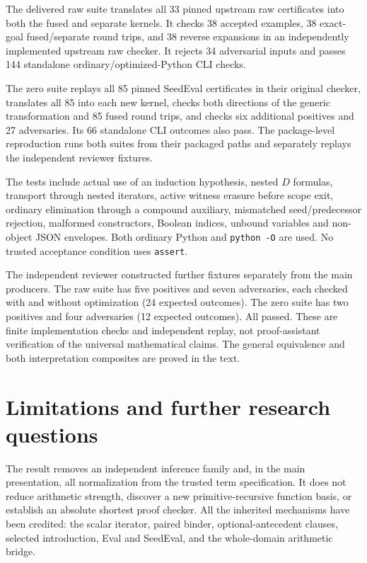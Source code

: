 The delivered raw suite translates all 33 pinned upstream raw certificates
into both the fused and separate kernels. It checks 38 accepted examples,
38 exact-goal fused/separate round trips, and 38 reverse expansions in an
independently implemented upstream raw checker. It rejects 34 adversarial
inputs and passes 144 standalone ordinary/optimized-Python CLI checks.

The zero suite replays all 85 pinned SeedEval certificates in their original
checker, translates all 85 into each new kernel, checks both directions
of the generic transformation and 85 fused round trips, and checks six
additional positives and 27 adversaries. Its 66 standalone CLI outcomes
also pass. The package-level reproduction runs both suites from their
packaged paths and separately replays the independent reviewer fixtures.


The tests include actual use of an induction hypothesis, nested $D$
formulas, transport through nested iterators, active witness erasure before
scope exit, ordinary elimination through a compound auxiliary, mismatched
seed/predecessor rejection, malformed constructors, Boolean indices,
unbound variables and non-object JSON envelopes. Both ordinary Python and
\texttt{python -O} are used. No trusted acceptance condition uses
\texttt{assert}.

The independent reviewer constructed further fixtures separately from the
main producers. The raw suite has five positives and seven adversaries,
each checked with and without optimization (24 expected outcomes). The
zero suite has two positives and four adversaries (12 expected outcomes).
All passed. These are finite implementation checks and independent replay,
not proof-assistant verification of the universal mathematical claims.
The general equivalence and both interpretation composites are proved
in the text.

\section{Limitations and further research questions}
\label{sec:questions}

The result removes an independent inference family and, in the main
presentation, all normalization from the trusted term specification. It
does not reduce arithmetic strength, discover a new primitive-recursive
function basis, or establish an absolute shortest proof checker. All the
inherited mechanisms have been credited: the scalar iterator, paired
binder, optional-antecedent clauses, selected introduction, Eval and
SeedEval, and the whole-domain arithmetic bridge.

